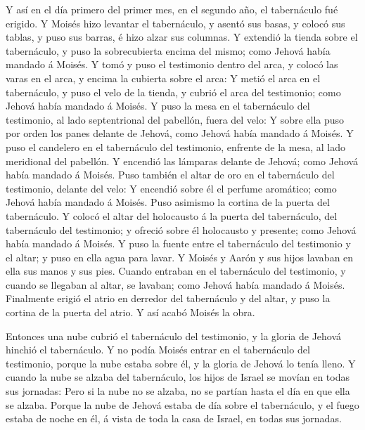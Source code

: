  Y así en el día primero del primer mes, en el segundo año,
el tabernáculo fué erigido.  Y Moisés hizo levantar el
tabernáculo, y asentó sus basas, y colocó sus tablas, y puso sus barras,
é hizo alzar sus columnas.  Y extendió la tienda sobre el
tabernáculo, y puso la sobrecubierta encima del mismo; como Jehová había
mandado á Moisés.  Y tomó y puso el testimonio dentro del
arca, y colocó las varas en el arca, y encima la cubierta sobre el arca:
 Y metió el arca en el tabernáculo, y puso el velo de la
tienda, y cubrió el arca del testimonio; como Jehová había mandado á
Moisés.  Y puso la mesa en el tabernáculo del testimonio,
al lado septentrional del pabellón, fuera del velo:  Y
sobre ella puso por orden los panes delante de Jehová, como Jehová había
mandado á Moisés.  Y puso el candelero en el tabernáculo
del testimonio, enfrente de la mesa, al lado meridional del pabellón.
 Y encendió las lámparas delante de Jehová; como Jehová
había mandado á Moisés.  Puso también el altar de oro en el
tabernáculo del testimonio, delante del velo:  Y encendió
sobre él el perfume aromático; como Jehová había mandado á Moisés.
 Puso asimismo la cortina de la puerta del tabernáculo.
 Y colocó el altar del holocausto á la puerta del
tabernáculo, del tabernáculo del testimonio; y ofreció sobre él
holocausto y presente; como Jehová había mandado á Moisés. 
Y puso la fuente entre el tabernáculo del testimonio y el altar; y puso
en ella agua para lavar.  Y Moisés y Aarón y sus hijos
lavaban en ella sus manos y sus pies.  Cuando entraban en
el tabernáculo del testimonio, y cuando se llegaban al altar, se
lavaban; como Jehová había mandado á Moisés.  Finalmente
erigió el atrio en derredor del tabernáculo y del altar, y puso la
cortina de la puerta del atrio. Y así acabó Moisés la obra.

 Entonces una nube cubrió el tabernáculo del testimonio, y
la gloria de Jehová hinchió el tabernáculo.  Y no podía
Moisés entrar en el tabernáculo del testimonio, porque la nube estaba
sobre él, y la gloria de Jehová lo tenía lleno.  Y cuando
la nube se alzaba del tabernáculo, los hijos de Israel se movían en
todas sus jornadas:  Pero si la nube no se alzaba, no se
partían hasta el día en que ella se alzaba.  Porque la nube
de Jehová estaba de día sobre el tabernáculo, y el fuego estaba de noche
en él, á vista de toda la casa de Israel, en todas sus jornadas.
